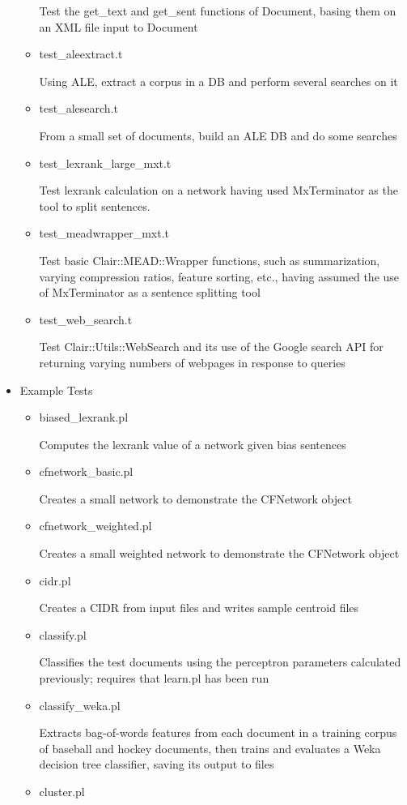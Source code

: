 \begin{itemize}
\begin{itemize}
 Test the get\_text and get\_sent functions of Document, basing
 them on an XML file input to Document 
  \item test\_aleextract.t

 Using ALE, extract a corpus in a DB and perform several
 searches on it 
  \item test\_alesearch.t

 From a small set of documents, build an ALE DB and do some
 searches 
  \item test\_lexrank\_large\_mxt.t

 Test lexrank calculation on a network having used MxTerminator
 as the tool to split sentences. 
  \item test\_meadwrapper\_mxt.t

 Test basic Clair::MEAD::Wrapper functions, such as
 summarization, varying compression ratios, feature sorting,
 etc., having assumed the use of MxTerminator as a sentence
 splitting tool 
  \item test\_web\_search.t

 Test Clair::Utils::WebSearch and its use of the Google
 search API for returning varying numbers of webpages
 in response to queries 
\end{itemize}

\item Example Tests

\begin{itemize}
  \item biased\_lexrank.pl

 Computes the lexrank value of a network given bias sentences
  \item cfnetwork\_basic.pl

 Creates a small network to demonstrate the CFNetwork object
  \item cfnetwork\_weighted.pl

 Creates a small weighted network to demonstrate
 the CFNetwork object
  \item cidr.pl

 Creates a CIDR from input files and writes sample
 centroid files 
  \item classify.pl

 Classifies the test documents using the perceptron parameters
 calculated previously; requires that learn.pl has been run
  \item classify\_weka.pl

 Extracts bag-of-words features from each document
 in a training corpus of baseball and hockey documents,
 then trains and evaluates a Weka decision tree classifier,
 saving its output to files
  \item cluster.pl


\end{itemize}
\end{itemize}
